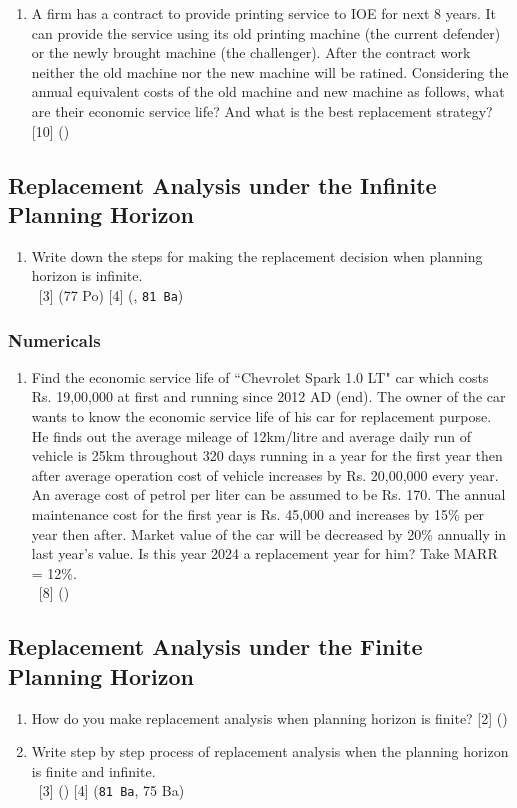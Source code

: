 \documentclass[12pt]{article}
\newcommand{\enter}{\\\textcolor{white}{1}}
\begin{document}
\begin{enumerate}
			\item A firm has a contract to provide printing service to IOE for next 8 years. It can provide the service using its old printing machine (the current defender) or the newly brought machine (the challenger). After the contract work neither the old machine nor the new machine will be ratined. Considering the annual equivalent costs of the old machine and new machine as follows, what are their economic service life? And what is the best replacement strategy? \hfill [10] ()
		\end{enumerate}

	\subsection{Replacement Analysis under the Infinite Planning Horizon}
		\begin{enumerate}
			\item Write down the steps for making the replacement decision when planning horizon is infinite.
			\enter\hfill [3] (77 Po) [4] (, \texttt{81 Ba})
		\end{enumerate}
			
		\subsubsection{Numericals}
			\begin{enumerate}
				\item Find the economic service life of ``Chevrolet Spark 1.0 LT" car which costs Rs. 19,00,000 at first and running since 2012 AD (end). The owner of the car wants to know the economic service life of his car for replacement purpose. He finds out the average mileage of 12km/litre and average daily run of vehicle is 25km throughout 320 days running in a year for the first year then after average operation cost of vehicle increases by Rs. 20,00,000 every year. An average cost of petrol per liter can be assumed to be Rs. 170. The annual maintenance cost for the first year is Rs. 45,000 and increases by 15\% per year then after. Market value of the car will be decreased by 20\% annually in last year's value. Is this year 2024 a replacement year for him? Take MARR = 12\%. 
				\enter\hfill [8] ()
			
			\end{enumerate}

		\subsection{Replacement Analysis under the Finite Planning Horizon}
			\begin{enumerate}
				\item How do you make replacement analysis when planning horizon is finite? \hfill [2] ()

				\item Write step by step process of replacement analysis when the planning horizon is finite and infinite.
				\enter\hfill [3] () [4] (\texttt{81 Ba}, 75 Ba)
			\end{enumerate}
\end{document}
